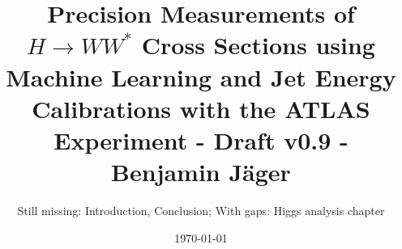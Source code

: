 

\endofdump


% 

\newif\ifIMAGES
\IMAGEStrue




\newcommand{\paperfiguredir}{figures/paper-figures}

\author{Still missing: Introduction, Conclusion; With gaps: Higgs analysis chapter}
\date{\today}
\title{Precision Measurements of $H \to WW^*$ Cross Sections using Machine Learning and Jet Energy Calibrations with the ATLAS Experiment - Draft v0.9 - Benjamin Jäger}





\maketitle





\tableofcontents


\newcommand{\chapterdir}{chapters}
%



